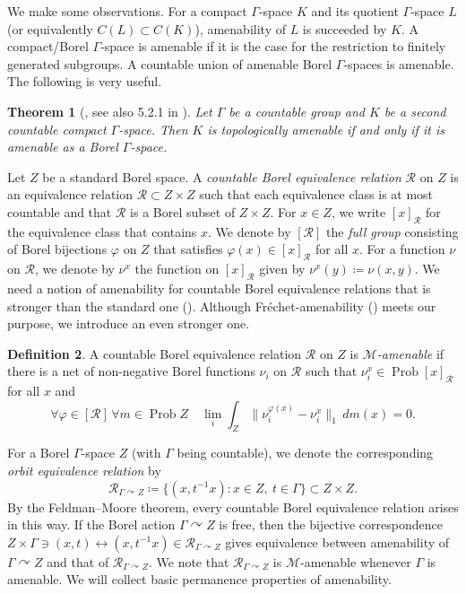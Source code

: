 \documentclass[12pt,nosumlimits,nonamelimits]{amsart}
\newtheorem{thm}{Theorem}
\theoremstyle{remark}
\theoremstyle{definition}
\newtheorem{defn}[thm]{Definition}
\newcommand{\cM}{\mathcal{M}}
\newcommand{\cR}{\mathcal{R}}
\newcommand{\vp}{\varphi}
\newcommand{\Ga}{\Gamma}
\newcommand{\acts}{\curvearrowright}
\DeclareMathOperator{\Prob}{Prob}
\begin{document}
We make some observations. 
For a compact $\Ga$-space $K$ and its 
quotient $\Ga$-space $L$   
(or equivalently $C(L)\subset C(K)$),  
amenability of $L$ is succeeded by $K$. 
A compact/Borel $\Ga$-space is amenable if 
it is the case for the restriction to 
finitely generated subgroups. 
A countable union of amenable Borel $\Ga$-spaces 
is amenable. 
The following is very useful. 

\begin{thm}[\cite{anantharaman-delaroche,adr}, see also 5.2.1 in \cite{bo}]\label{thm:topbob}
Let $\Ga$ be a countable group 
and $K$ be a second countable compact $\Ga$-space. 
Then $K$ is topologically amenable if and only if it is amenable 
as a Borel $\Ga$-space. 
\end{thm}

Let $Z$ be a standard Borel space. 
A \emph{countable Borel equivalence relation} $\cR$ on $Z$ 
is an equivalence relation $\cR\subset Z\times Z$ such that 
each equivalence class is at most countable and that $\cR$ 
is a Borel subset of $Z\times Z$. 
For $x\in Z$, we write $[x]_{\cR}$ 
for the equivalence class that contains $x$.
We denote by $[\cR]$ the \emph{full group} consisting 
of Borel bijections $\vp$ on $Z$ that 
satisfies $\vp(x)\in[x]_\cR$ for all $x$.
For a function $\nu$ on $\cR$, 
we denote by $\nu^x$ the function on $[x]_{\cR}$ 
given by $\nu^x(y) \coloneq \nu(x,y)$. 
We need a notion of amenability for countable Borel 
equivalence relations that is stronger than 
the standard one (\cite{jkl}). 
Although Fr\'{e}chet-amenability (\cite{jkl}) meets 
our purpose, we introduce an even stronger one. 

\begin{defn}
A countable Borel equivalence relation $\cR$ on $Z$ 
is \emph{$\cM$-amenable} if there is a net of 
non-negative Borel functions $\nu_i$ on $\cR$ 
such that $\nu_i^x\in\Prob {[x]_{\cR}}$ 
for all $x$ and 
\[
\forall \vp\in[\cR]\,\forall m\in\Prob Z\quad 
\lim_i\int_Z \|\nu_i^{\vp(x)}-\nu_i^x\|_1 \,dm(x)=0.
\]
\end{defn}

For a Borel $\Ga$-space $Z$ (with $\Ga$ being countable), 
we denote the corresponding 
\emph{orbit equivalence relation} by 
\[
\cR_{\Ga\acts Z} \coloneq \{ (x,t^{-1}x) : x\in Z,\ t\in\Ga \} \subset Z\times Z.
\]
By the Feldman--Moore theorem, 
every countable Borel equivalence relation arises in this way.
If the Borel action $\Ga\acts Z$ is free, then the bijective 
correspondence 
$Z\times\Ga \ni (x,t) \leftrightarrow (x,t^{-1}x) \in \cR_{\Ga\acts Z}$ 
gives equivalence between amenability of $\Ga\acts Z$ and 
that of $\cR_{\Ga\acts Z}$. 
We note that $\cR_{\Ga\acts Z}$ is $\cM$-amenable 
whenever $\Ga$ is amenable. 
We will collect basic permanence properties of amenability. 
\end{document}
